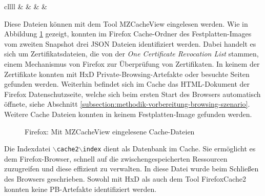 \begin{appendices}
{\begin{landscape}
\begin{table}[h!]
{\begin{tabular}{cllll}
	  &                                                                           &  &  &                 \\ \hline
	\end{tabular}
	}
	\end{table}
\end{landscape}
}
\restoregeometry
%

Diese Dateien können mit dem Tool MZCacheView eingelesen werden.
Wie in Abbildung \ref{img:mzcacheview} gezeigt, konnten im Firefox Cache-Ordner des Festplatten-Images vom zweiten Snapshot drei JSON Dateien identifiziert werden. Dabei handelt es sich um Zertifikatsdateien, die von der \textit{One Certificate Revocation List} stammen, einem Mechanismus von Firefox zur Überprüfung von Zertifikaten. In keinem der Zertifikate konnten mit HxD Private-Browsing-Artefakte oder besuchte Seiten gefunden werden. \cite{TechSupportGuy.05.06.2023}
Weiterhin befindet sich im Cache das HTML-Dokument der Firefox Datenschutzseite, welche sich beim ersten Start des Browsers automatisch öffnete, siehe Abschnitt \ref{subsection:methodik-vorbereitung-browsing-szenario}.
Weitere Cache Dateien konnten in keinem Festplatten-Image gefunden werden.
\begin{figure}[h!]
	\caption{Firefox: Mit MZCacheView eingelesene Cache-Dateien}
	\label{img:mzcacheview}
\end{figure}
Die Indexdatei \texttt{$\backslash$cache2$\backslash$index} dient als Datenbank im Cache. Sie ermöglicht es dem Firefox-Browser, schnell auf die zwischengespeicherten Ressourcen zuzugreifen und diese effizient zu verwalten. In diese Datei wurde beim Schließen des Browsers geschrieben. Sowohl mit HxD als auch dem Tool FirefoxCache2 konnten keine PB-Artefakte identifiziert werden.


\end{appendices}
